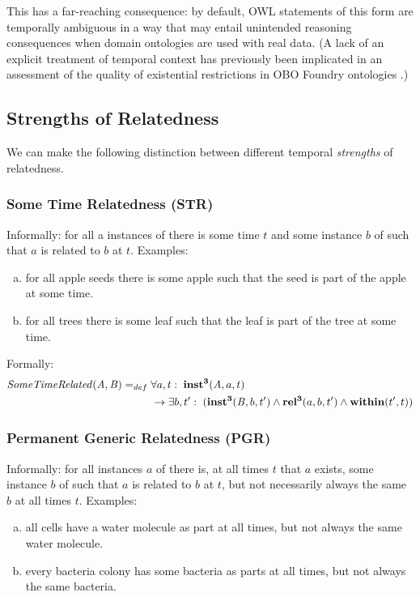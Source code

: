 This has a far-reaching consequence: by default, OWL statements of this form are temporally ambiguous in a way that may entail unintended reasoning consequences when domain ontologies are used with real data. (A lack of an explicit treatment of temporal context has previously been implicated in an assessment of the quality of existential restrictions in OBO Foundry ontologies \cite{boeker2011}.)

\subsection*{Strengths of Relatedness}

We can make the following distinction between different temporal \emph{strengths} of relatedness.

\subsubsection*{Some Time Relatedness (STR)}

Informally: for all a instances of  there is some time $t$ and some instance $b$ of
 such that $a$ is related to $b$ at $t$. Examples:
\begin{enumerate}[(a)]
\item for all apple seeds there is
some apple such that the seed is part of the apple at some time.
\item for all
trees there is some leaf such that the leaf is part of the tree at some time.
\end{enumerate}

Formally:
\begin{equation}
\begin{split}
\mathit{SomeTimeRelated}(\mathit{A},\mathit{B}) =_{def}&\;
\forall a, t:\; \mathrm{\mathbf{inst^3}}(\mathit{A}, a, t) \\
&\ \rightarrow
\exists b, t^\prime:\;(\mathrm{\mathbf{inst^3}}(\mathit{B},b,t^\prime) \wedge
\mathrm{\mathbf{rel^3}}(a,b,t^\prime) \wedge \mathrm{\mathbf{within}}(t^\prime,t))
\end{split}
\label{eq:temporarily:cls}
\end{equation}

\subsubsection*{Permanent Generic Relatedness (PGR)}

Informally: for all instances $a$ of  there is, at all times $t$ that
$a$ exists,
some instance $b$ of  such that $a$ is related to $b$ at $t$, but not necessarily
always the same $b$ at all times $t$. Examples:
\begin{enumerate}[(a)]
\item all cells have a water molecule as
part at all times, but not always the same water molecule.
\item every bacteria colony has some bacteria as parts at all times, but not
always the same bacteria.
\end{enumerate}

